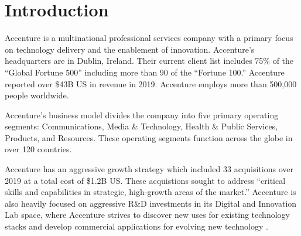 \section{Introduction}

Accenture is a multinational professional services company with a primary focus on technology delivery and the enablement of innovation. Accenture's headquarters are in Dublin, Ireland. Their current client list includes 75\% of the ``Global Fortune 500'' including more than 90 of the ``Fortune 100.'' Accenture reported over \$43B  US in revenue in 2019. Accenture employs more than 500,000 people worldwide.

Accenture's business model divides the company into five primary operating segments: Communications, Media \& Technology, Health \& Public Services, Products, and Resources. These operating segments function across the globe in over 120 countries.

Accenture has an aggressive growth strategy which included 33 acquisitions over 2019 at a total cost of \$1.2B US. These acquistions sought to address ``critical skills and capabilities in strategic, high-growth areas of the market.'' Accenture is also heavily focused on aggressive R\&D investments in its Digital and Innovation Lab space, where Accenture strives to discover new uses for existing technology stacks and develop commercial applications for evolving new technology \parencite{AccenturePLC2019, wagleEvaluationFinancialStatus2020}.



